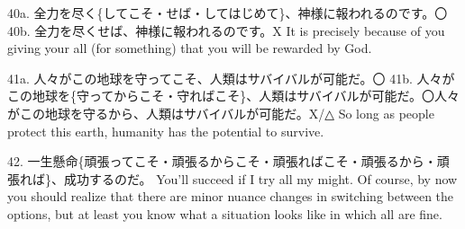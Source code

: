 \par{40a. 全力を尽く\{してこそ・せば・してはじめて\}、神様に報われるのです。〇 \hfill\break
40b. 全力を尽くせば、神様に報われるのです。X \hfill\break
It is precisely because of you giving your all (for something) that you will be rewarded by God. }

\par{41a. 人々がこの地球を守ってこそ、人類はサバイバルが可能だ。〇 \hfill\break
41b. 人々がこの地球を\{守ってからこそ・守ればこそ\}、人類はサバイバルが可能だ。〇人々がこの地球を守るから、人類はサバイバルが可能だ。X\slash △ \hfill\break
So long as people protect this earth, humanity has the potential to survive. }

\par{42. 一生懸命\{頑張ってこそ・頑張るからこそ・頑張ればこそ・頑張るから・頑張れば\}、成功するのだ。 \hfill\break
You'll succeed if I try all my might. Of course, by now you should realize that there are minor nuance changes in switching between the options, but at least you know what a situation looks like in which all are fine. }
    